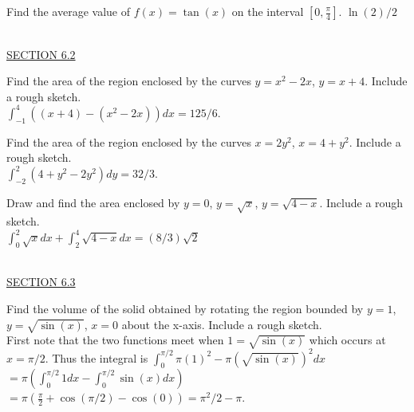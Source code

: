 \documentclass{exam}
\begin{document}
\begin{questions}
\begin{parts}
  \end{parts}

\question Find the average value of $f(x)=\tan(x)$ on the interval $\left[ 0, \frac{\pi}{4} \right]$.  {\color{red}  $\ln(2)/2$}



\ \\
\underline{SECTION 6.2}

\question Find the area of the region enclosed by the curves $y=x^2-2x$, $y=x+4$.  Include a rough sketch. 
\\ {\color{red}   $\displaystyle\int_{-1}^4 \left(  (x+4)-(x^2-2x) \right)  dx = 125/6$.}

\question Find the area of the region enclosed by the curves $x=2y^2$, $x=4+y^2$.   Include a rough sketch. 
\\ {\color{red}   $\displaystyle\int_{-2}^2 (4+y^2-2y^2)dy = 32/3$.}

\question Draw and find the area enclosed by $y=0$, $y=\sqrt{x}$, $y=\sqrt{4-x}$.  Include a rough sketch.  
\\ {\color{red} $\displaystyle\int_0^2 \sqrt{x} dx + \displaystyle\int_2^4 \sqrt{4-x}dx = (8/3)\sqrt{2}$}

    \newpage\thispagestyle{empty}

\ \\
\underline{SECTION 6.3 }

\question Find the volume of the solid obtained by rotating the region bounded by $y = 1$, $y= \sqrt{\sin(x)}$, $x=0$ about the x-axis.   Include a rough sketch.
\\ {\color{red} First note that the two functions meet when $1=\sqrt{\sin(x)}$ which occurs at $x=\pi/2$.  Thus the integral is $\displaystyle\int_0^{\pi/2} \pi \left( 1 \right)^2 - \pi \left( \sqrt{\sin(x)} \right)^2 dx$  $ = \pi \left( \displaystyle\int_0^{\pi/2}{ 1 dx} - \displaystyle\int_0^{\pi/2} \sin(x)dx \right)$ $ = \pi \left( \frac{\pi}{2} + \cos(\pi/2) - \cos(0)\right) = \pi^2/2 - \pi$.}  


\end{questions}
\end{document}
